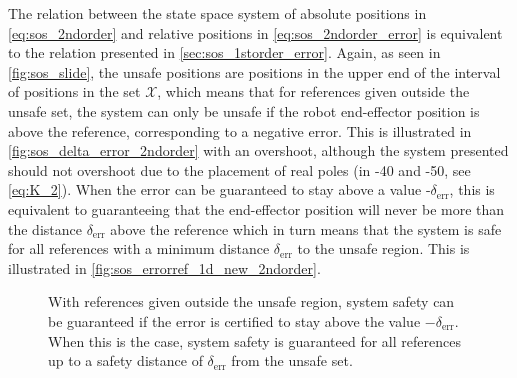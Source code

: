 \vspace{-2mm}
The relation between the state space system of absolute positions in \autoref{eq:sos_2ndorder} and relative positions in \autoref{eq:sos_2ndorder_error} is equivalent to the relation presented in \autoref{sec:sos_1storder_error}.
Again, as seen in \autoref{fig:sos_slide}, the unsafe positions are positions in the upper end of the interval of positions in the set $\mathcal{X}$, which means that for references given outside the unsafe set, the system can only be unsafe if the robot end-effector position is above the reference, corresponding to a negative error. This is illustrated in \autoref{fig:sos_delta_error_2ndorder} with an overshoot, although the system presented should  not overshoot due to the placement of real poles (in -40 and -50, see \autoref{eq:K_2}). When the error can be guaranteed to stay above a value -$\delta_\text{err}$, this is equivalent to guaranteeing that the end-effector position will never be more than the distance $\delta_\text{err}$ above the reference which in turn means that the system is safe for all references with a minimum distance $\delta_\text{err}$ to the unsafe region. This is illustrated in \autoref{fig:sos_errorref_1d_new_2ndorder}.

\vspace{-2mm}
\begin{figure}[htbp]
	\centering
	\hspace{3mm}
	\hspace{3mm}
	\caption{With references given outside the unsafe region, system safety can be guaranteed if the error is certified to stay above the value $-\delta_\text{err}$. When this is the case, system safety is guaranteed for all references up to a safety distance of $\delta_\text{err}$ from the unsafe set.}
	\label{fig:sets_error_2ndorder}
\end{figure}


